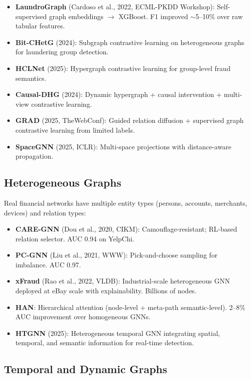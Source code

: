\documentclass[11pt]{article}
\begin{document}
\begin{itemize}
\item \textbf{LaundroGraph} (Cardoso et al., 2022, ECML-PKDD Workshop): Self-supervised graph embeddings $\to$ XGBoost. F1 improved $\sim$5--10\% over raw tabular features.
\item \textbf{Bit-CHetG} (2024): Subgraph contrastive learning on heterogeneous graphs for laundering group detection.
\item \textbf{HCLNet} (2025): Hypergraph contrastive learning for group-level fraud semantics.
\item \textbf{Causal-DHG} (2024): Dynamic hypergraph + causal intervention + multi-view contrastive learning.
\item \textbf{GRAD} (2025, TheWebConf): Guided relation diffusion + supervised graph contrastive learning from limited labels.
\item \textbf{SpaceGNN} (2025, ICLR): Multi-space projections with distance-aware propagation.
\end{itemize}

\subsection{Heterogeneous Graphs}

Real financial networks have multiple entity types (persons, accounts, merchants, devices) and relation types:

\begin{itemize}
\item \textbf{CARE-GNN} (Dou et al., 2020, CIKM): Camouflage-resistant; RL-based relation selector. AUC 0.94 on YelpChi.
\item \textbf{PC-GNN} (Liu et al., 2021, WWW): Pick-and-choose sampling for imbalance. AUC 0.97.
\item \textbf{xFraud} (Rao et al., 2022, VLDB): Industrial-scale heterogeneous GNN deployed at eBay scale with explainability. Billions of nodes.
\item \textbf{HAN}: Hierarchical attention (node-level + meta-path semantic-level). 2--8\% AUC improvement over homogeneous GNNs.
\item \textbf{HTGNN} (2025): Heterogeneous temporal GNN integrating spatial, temporal, and semantic information for real-time detection.
\end{itemize}

\subsection{Temporal and Dynamic Graphs}
\end{document}

